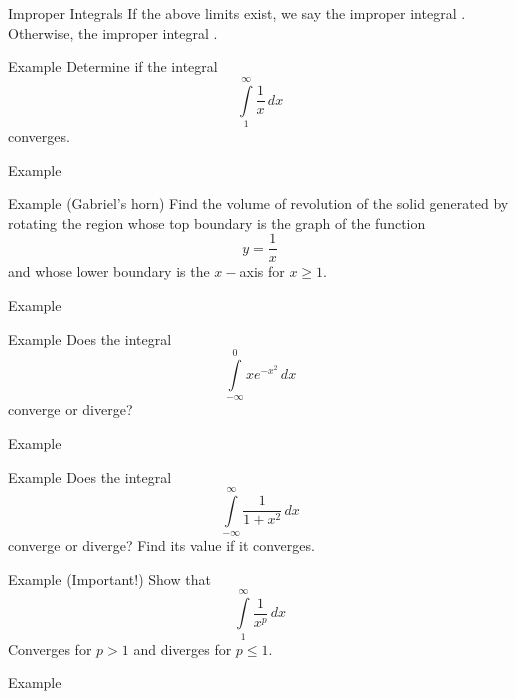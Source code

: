 \documentclass[presentation]{beamer}
\begin{document}
\begin{frame}[label={sec:orgaf3dc2f}]{Improper Integrals}
If the above limits exist, we say the improper integral \uline{\hspace*{1in}}.
Otherwise, the improper integral \uline{\hspace*{1in}}.
\end{frame}

\begin{frame}[label={sec:org4c2cce2}]{Example}
Determine if the integral
\[
\int\limits_1^{\infty} \frac{1}{x}\,dx \]
converges.
\vspace{10in}
\end{frame}

\begin{frame}[label={sec:orgde3979a}]{Example}
\end{frame}

\begin{frame}[label={sec:org78e7807}]{Example (Gabriel's horn)}
Find the volume of revolution of the solid generated by rotating the
region whose top boundary is the graph of the function
\[y = \frac{1}{x} \]
and whose lower boundary is the \(x-\)axis for \(x \ge 1\).
\vspace{10in}
\end{frame}

\begin{frame}[label={sec:orga94118e}]{Example}
\end{frame}

\begin{frame}[label={sec:orgce354cf}]{Example}
Does the integral
\[
\int\limits_{-\infty}^0 xe^{-x^2}\,dx \]
converge or diverge?
\vspace{10in}
\end{frame}

\begin{frame}[label={sec:org7ebbf8f}]{Example}
\end{frame}

\begin{frame}[label={sec:orgafa4b45}]{Example}
Does the integral
\[
\int\limits_{-\infty}^{\infty} \frac{1}{1+x^2}\,dx \]
converge or diverge? Find its value if it converges.
\vspace{10in}
\end{frame}

\begin{frame}[label={sec:orgb5f47c1}]{Example (Important!)}
Show that
\[\int\limits_1^{\infty} \frac{1}{x^p}\,dx \]
Converges for \(p > 1\) and diverges for \(p \le 1\).
\vspace{10in}
\end{frame}

\begin{frame}[label={sec:orgfb1d57e}]{Example}
\end{frame}
\end{document}

